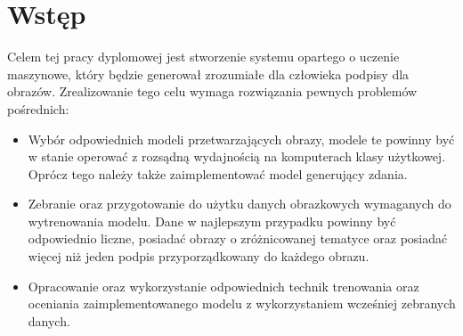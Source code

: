 
\usepackage{algorithm}
\usepackage{algorithmic}
\usepackage{tabularx}
\usepackage{xcolor}
\usepackage{hyperref}
\usepackage{blindtext}
\newcommand{\kk}[1]{\todo[color=cyan!40,inline]{KK: #1}}

\newcommand{\Leg}[3][]{\mleft(\frac{#2\mathstrut}{#3}\mright)_{\mkern-6mu#1}} 
\newcommand{\studia}{STACJONARNE STUDIA I$^\circ$}
\newcommand{\temat}{Projekt i implementacja systemu do generowania podpisów na podstawie zdjęć}
\newcommand{\odstep}{40mm}
\newcommand{\autor}{Radosław KOPIŃSKI}
\newcommand{\promotor}{dr inż. Karol ANTCZAK}
\newcommand{\data}{Warszawa 2022}
\newcommand{\kierunek}{INFORMATYKA}
\newcommand{\specjalnosc}{INŻYNIERIA SYSTEMÓW}
\newcommand{\zadania}{

\begin{enumerate}
    \item Przegląd metod uczenia głębokiego w kontekście przetwarzania obrazów
    \item Przygotowanie opisu algorytmu generowania podpisów na podstawie zdjęć
    \item Implementacja algorytmu
    \item Trening i testy modelu na zebranym zbiorze danych
\end{enumerate}
}

\newcommand{\quot}[1]{``#1''}
\newtheorem{theorem}{Twierdzenie}

\newtheorem{definition}{Definicja}
\newtheorem{cor}{Wniosek}
\newtheorem{ex}{Przykład}


\inserttitlepage

\tableofcontents

\newpage

\section*{Wstęp}
Celem tej pracy dyplomowej jest stworzenie systemu opartego o uczenie maszynowe, który będzie generował zrozumiałe dla człowieka podpisy dla obrazów. Zrealizowanie tego celu wymaga rozwiązania pewnych problemów pośrednich:
\begin{itemize}
	\item Wybór odpowiednich modeli przetwarzających obrazy, modele te powinny być w stanie operować z rozsądną wydajnością na komputerach klasy użytkowej. Oprócz tego należy także zaimplementować model generujący zdania.
	\item Zebranie oraz przygotowanie do użytku danych obrazkowych wymaganych do wytrenowania modelu. Dane w najlepszym przypadku powinny być odpowiednio liczne, posiadać obrazy o zróżnicowanej tematyce oraz posiadać więcej niż jeden podpis przyporządkowany do każdego obrazu.
	\item Opracowanie oraz wykorzystanie odpowiednich technik trenowania oraz oceniania zaimplementowanego modelu z wykorzystaniem wcześniej zebranych danych.
\end{itemize}

